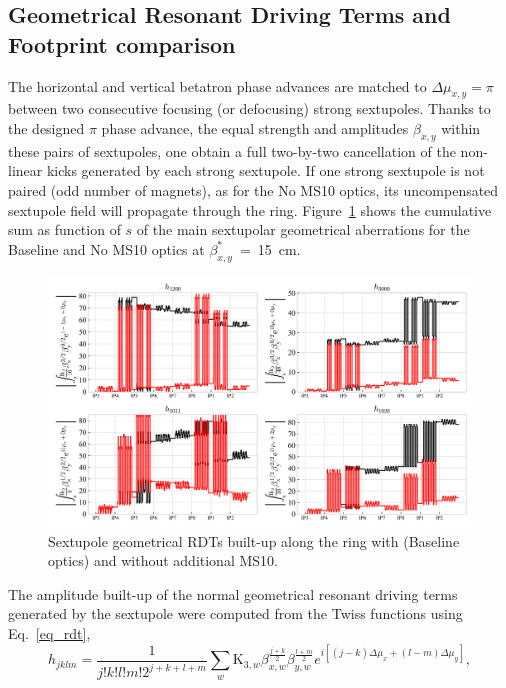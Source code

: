 \documentclass{cernatsnote}
\begin{document}
\subsection{Geometrical Resonant Driving Terms and Footprint comparison}

The horizontal and vertical betatron phase advances are matched to $\Delta\mu_{x,y} = \pi$ between two consecutive focusing (or defocusing) strong sextupoles. Thanks to the designed $\pi$ phase advance, the equal strength and amplitudes $\beta_{x,y}$ within these pairs of sextupoles, one obtain a full two-by-two cancellation of the non-linear kicks generated by each strong sextupole. If one strong sextupole is not paired (odd number of magnets), as for the No MS10 optics, its uncompensated sextupole field will propagate through the ring. Figure~\ref{rdt_twiss_ms10} shows the cumulative sum as function of $s$ of the main sextupolar geometrical aberrations for the Baseline and No MS10 optics at $\beta_{x,y}^{*}$~=~15~cm.
\begin{figure}[h!]
\centering
\includegraphics[width=1\textwidth]{images/rdt_twiss_base.png}
\caption{\label{rdt_twiss_ms10} Sextupole geometrical RDTs built-up along the ring with (Baseline optics) and without additional MS10.}
\end{figure}

\noindent The amplitude built-up of the normal geometrical resonant driving terms generated by the sextupole were computed from the Twiss functions using Eq.~\ref{eq_rdt},
\begin{equation}
\label{eq_rdt}
h_{jklm} = \frac{1}{j!k!l!m!2^{j+k+l+m}}\sum_{w} \mathrm{K}_{3,w} \beta_{x,w}^{\frac{j+k}{2}}\beta_{y,w}^{\frac{l+m}{2}}e^{i[(j-k)\Delta\mu_{x}+(l-m)\Delta\mu_{y}]} ,
\end{equation}
\end{document}
